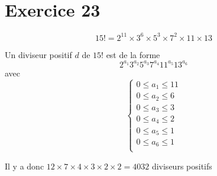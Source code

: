 \part{Exercice 23}

\[
15! = 2^{11} \times  3^6 \times  5^3 \times  7^2 \times  11 \times  13
\] 

Un diviseur positif $d$ de $15!$ est de la forme  \[
2^{a_1}3^{a_2}5^{a_3}7^{a_4}11^{a_5}13^{a_6}
\] avec \[
\begin{cases}
	0 \le a_1 \le 11\\
	0 \le a_2 \le 6\\
	0 \le a_3 \le 3\\
	0 \le a_4 \le 2\\
	0 \le a_5 \le 1\\
	0 \le a_6 \le 1\\
\end{cases}
\] 

Il y a donc $12 \times  7 \times  4 \times  3 \times  2 \times 2 = 4032$ diviseurs positifs
